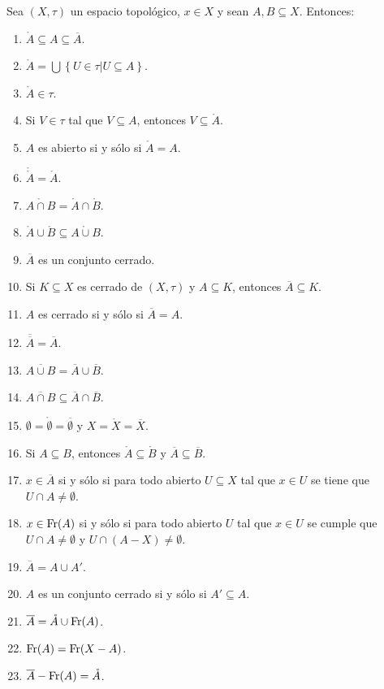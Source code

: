 \documentclass[12pt]{report}
\theoremstyle{largebreak}
\newcommand{\Int}[1]{\ensuremath{\mathring{#1}}}
\newcommand{\Cls}[1]{\ensuremath{\overline{#1}}}
\newcommand{\Fr}[1]{\ensuremath{\textup{Fr}(#1)}}
\begin{document}
    \begin{propo}
        Sea $(X,\tau)$ un espacio topológico, $x\in X$ y sean $A,B\subseteq X$. Entonces:
        \begin{enumerate}
            \item $\Int{A}\subseteq A\subseteq\Cls{A}$.
            \item $\Int{A}=\bigcup\left\{U\in\tau\big|U\subseteq A \right\}$.
            \item $\Int{A}\in\tau$.
            \item Si $V\in\tau$ tal que $V\subseteq A$, entonces $V\subseteq\Int{A}$.
            \item $A$ es abierto si y sólo si $\Int{A}=A$.
            \item $\Int{\Int{A}}=\Int{A}$.
            \item $\Int{A\cap B}=\Int{A}\cap\Int{B}$.
            \item $\Int{A}\cup\Int{B}\subseteq \Int{A\cup B}$.
            \item $\Cls{A}$ es un conjunto cerrado.
            \item Si $K\subseteq X$ es cerrado de $(X,\tau)$ y $A\subseteq K$, entonces $\Cls{A}\subseteq K$.
            \item $A$ es cerrado si y sólo si $\Cls{A}=A$.
            \item $\Cls{\Cls{A}}=\Cls{A}$.
            \item $\Cls{A\cup B}=\Cls{A}\cup\Cls{B}$.
            \item $\Cls{A\cap B}\subseteq\Cls{A}\cap\Cls{B}$.
            \item $\emptyset=\Int{\emptyset}=\Cls{\emptyset}$ y $X=\Int{X}=\Cls{X}$.
            \item Si $A\subseteq B$, entonces $\Int{A}\subseteq \Int{B}$ y $\Cls{A}\subseteq\Cls{B}$.
            \item $x\in\Cls{A}$ si y sólo si para todo abierto $U\subseteq X$ tal que $x\in U$ se tiene que $U\cap A\neq\emptyset$.
            \item $x\in\Fr{A}$ si y sólo si para todo abierto $U$ tal que $x\in U$ se cumple que $U\cap A\neq\emptyset$ y $U\cap (A-X)\neq\emptyset$.
            \item $\Cls{A}=A\cup A'$.
            \item $A$ es un conjunto cerrado si y sólo si $A'\subseteq A$.
            \item $\Cls{A}=\Int{A}\cup\Fr{A}$.
            \item $\Fr{A}=\Fr{X-A}$.
            \item $\Cls{A}-\Fr{A}=\Int{A}$.
        \end{enumerate}
    \end{propo}
\end{document}
